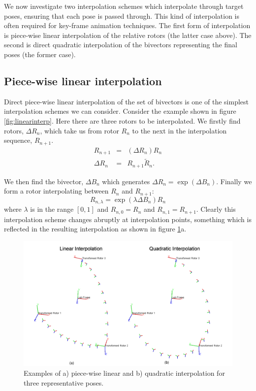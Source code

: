 We now investigate two interpolation schemes which interpolate through target
poses, ensuring that each pose is passed through. This kind of interpolation is
often required for key-frame animation techniques. The first form of
interpolation is piece-wise linear interpolation of the relative rotors (the
		latter case above). The second is direct quadratic
interpolation of the bivectors representing the final poses (the former case).


\subsection{Piece-wise linear interpolation}

Direct piece-wise linear interpolation of the set of bivectors is one of the simplest interpolation
schemes we can consider. Consider the example shown in figure \ref{fig:linearinterp}. Here there are
three rotors to be interpolated. We firstly find rotors, $\Delta R_n$, which take us from 
rotor $R_n$ to the next in the interpolation sequence, $R_{n+1}$.
\begin{eqnarray*}
R_{n+1} & = & (\Delta R_n) R_n\\
\Delta R_n & = & R_{n+1} \tilde{R}_n.
\end{eqnarray*}

We then find the bivector, $\Delta B_n$ which generates $\Delta R_n = \exp(\Delta B_n)$. Finally we
form a rotor interpolating between $R_n$  and $R_{n+1}$:
\[
R_{n,\lambda} = \exp(\lambda \Delta B_n)R_n
\]
where $\lambda$ is in the range $[0,1]$ and $R_{n,0} = R_n$ and $R_{n,1} = R_{n+1}$.
Clearly this interpolation scheme changes abruptly at interpolation points, something which is
reflected in the resulting interpolation as shown in figure \ref{fig:interp}a.

\begin{figure}\centering
\includegraphics[width=\columnwidth]{interp}
\caption{\label{fig:interp}Examples of a) piece-wise linear and b) quadratic interpolation for
three representative poses.}
\end{figure}

